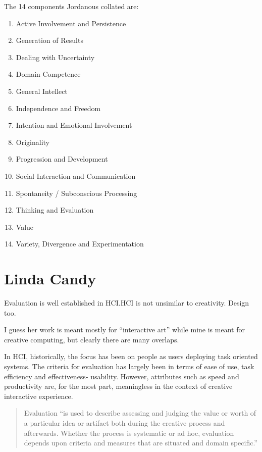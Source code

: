 The 14 components Jordanous collated are: \citeyear[p.118-120]{Jordanous2012}
\begin{enumerate}
  \item Active Involvement and Persistence
  \item Generation of Results
  \item Dealing with Uncertainty
  \item Domain Competence
  \item General Intellect
  \item Independence and Freedom
  \item Intention and Emotional Involvement
  \item Originality
  \item Progression and Development
  \item Social Interaction and Communication
  \item Spontaneity / Subconscious Processing
  \item Thinking and Evaluation
  \item Value
  \item Variety, Divergence and Experimentation
\end{enumerate}


\section{Linda Candy}

Evaluation is well established in HCI.\@ HCI is not unsimilar to creativity. Design too.

\begin{fcom}
  I guess her work is meant mostly for ``interactive art'' while mine is meant for creative computing, but clearly there are many overlaps.
\end{fcom}

In HCI, historically, the focus has been on people as users deploying task oriented systems. The criteria for evaluation has largely been in terms of ease of use, task efficiency and effectiveness- usability. However, attributes such as speed and productivity are, for the most part, meaningless in the context of creative interactive experience. \parencite[p.23]{Candy2012}

\begin{quote}
  Evaluation ``is used to describe assessing and judging the value or worth of a particular idea or artifact both during the creative process and afterwards. Whether the process is systematic or ad hoc, evaluation depends upon criteria and measures that are situated and domain specific.'' \parencite[p.7]{Candy2012}
\end{quote}

